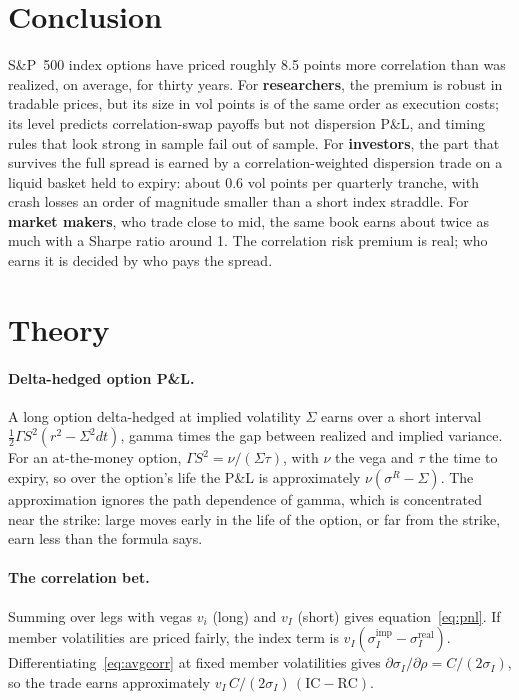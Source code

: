 \section{Conclusion}

S\&P~500 index options have priced roughly 8.5 points more correlation than was realized, on average, for thirty years. For \textbf{researchers}, the premium is robust in tradable prices, but its size in vol points is of the same order as execution costs; its level predicts correlation-swap payoffs but not dispersion P\&L, and timing rules that look strong in sample fail out of sample. For \textbf{investors}, the part that survives the full spread is earned by a correlation-weighted dispersion trade on a liquid basket held to expiry: about 0.6 vol points per quarterly tranche, with crash losses an order of magnitude smaller than a short index straddle. For \textbf{market makers}, who trade close to mid, the same book earns about twice as much with a Sharpe ratio around 1. The correlation risk premium is real; who earns it is decided by who pays the spread.




\appendix

\section{Theory}\label{app:theory}

\paragraph{Delta-hedged option P\&L.} A long option delta-hedged at implied volatility $\Sigma$ earns over a short interval $\tfrac12\Gamma S^2(r^2 - \Sigma^2 dt)$, gamma times the gap between realized and implied variance. For an at-the-money option, $\Gamma S^2 = \nu/(\Sigma\tau)$, with $\nu$ the vega and $\tau$ the time to expiry, so over the option's life the P\&L is approximately $\nu(\sigma^R - \Sigma)$. The approximation ignores the path dependence of gamma, which is concentrated near the strike: large moves early in the life of the option, or far from the strike, earn less than the formula says.

\paragraph{The correlation bet.} Summing over legs with vegas $v_i$ (long) and $v_I$ (short) gives equation~\eqref{eq:pnl}. If member volatilities are priced fairly, the index term is $v_I(\sigma_I^{\text{imp}} - \sigma_I^{\text{real}})$. Differentiating~\eqref{eq:avgcorr} at fixed member volatilities gives $\partial\sigma_I/\partial\rho = C/(2\sigma_I)$, so the trade earns approximately $v_I\,C/(2\sigma_I)\,(\text{IC} - \text{RC})$.

